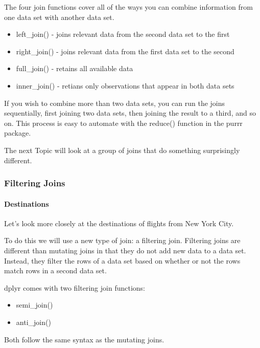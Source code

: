 \documentclass[
]{article}
\providecommand{\tightlist}{%
  \setlength{\itemsep}{0pt}\setlength{\parskip}{0pt}}
\begin{document}
The four join functions cover all of the ways you can combine
information from one data set with another data set.

\begin{itemize}
\tightlist
\item
  left\_join() - joins relevant data from the second data set to the
  first
\item
  right\_join() - joins relevant data from the first data set to the
  second
\item
  full\_join() - retains all available data
\item
  inner\_join() - retians only observations that appear in both data
  sets
\end{itemize}

If you wish to combine more than two data sets, you can run the joins
sequentially, first joining two data sets, then joining the result to a
third, and so on. This process is easy to automate with the reduce()
function in the purrr package.

The next Topic will look at a group of joins that do something
surprisingly different.

\hypertarget{filtering-joins}{%
\subsubsection{Filtering Joins}\label{filtering-joins}}

\hypertarget{destinations}{%
\paragraph{Destinations}\label{destinations}}

Let's look more closely at the destinations of flights from New York
City.

To do this we will use a new type of join: a filtering join. Filtering
joins are different than mutating joins in that they do not add new data
to a data set. Instead, they filter the rows of a data set based on
whether or not the rows match rows in a second data set.

dplyr comes with two filtering join functions:

\begin{itemize}
\tightlist
\item
  semi\_join()
\item
  anti\_join()
\end{itemize}

Both follow the same syntax as the mutating joins.
\end{document}
